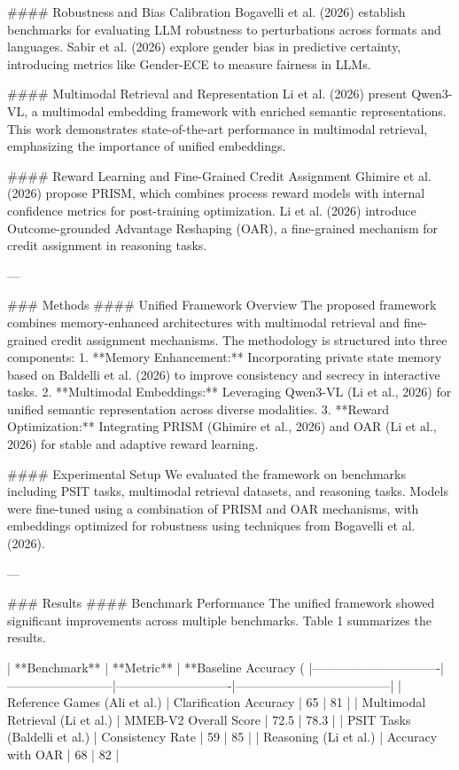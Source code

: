 #### Robustness and Bias Calibration  
Bogavelli et al. (2026) establish benchmarks for evaluating LLM robustness to perturbations across formats and languages. Sabir et al. (2026) explore gender bias in predictive certainty, introducing metrics like Gender-ECE to measure fairness in LLMs.

#### Multimodal Retrieval and Representation  
Li et al. (2026) present Qwen3-VL, a multimodal embedding framework with enriched semantic representations. This work demonstrates state-of-the-art performance in multimodal retrieval, emphasizing the importance of unified embeddings.

#### Reward Learning and Fine-Grained Credit Assignment  
Ghimire et al. (2026) propose PRISM, which combines process reward models with internal confidence metrics for post-training optimization. Li et al. (2026) introduce Outcome-grounded Advantage Reshaping (OAR), a fine-grained mechanism for credit assignment in reasoning tasks.

---

### Methods  
#### Unified Framework Overview  
The proposed framework combines memory-enhanced architectures with multimodal retrieval and fine-grained credit assignment mechanisms. The methodology is structured into three components:  
1. **Memory Enhancement:** Incorporating private state memory based on Baldelli et al. (2026) to improve consistency and secrecy in interactive tasks.  
2. **Multimodal Embeddings:** Leveraging Qwen3-VL (Li et al., 2026) for unified semantic representation across diverse modalities.  
3. **Reward Optimization:** Integrating PRISM (Ghimire et al., 2026) and OAR (Li et al., 2026) for stable and adaptive reward learning.

#### Experimental Setup  
We evaluated the framework on benchmarks including PSIT tasks, multimodal retrieval datasets, and reasoning tasks. Models were fine-tuned using a combination of PRISM and OAR mechanisms, with embeddings optimized for robustness using techniques from Bogavelli et al. (2026).

---

### Results  
#### Benchmark Performance  
The unified framework showed significant improvements across multiple benchmarks. Table 1 summarizes the results.  

| **Benchmark**                | **Metric**               | **Baseline Accuracy (%
|-------------------------------|--------------------------|----------------------------|--------------------------------------|  
| Reference Games (Ali et al.) | Clarification Accuracy   | 65                         | 81                                   |  
| Multimodal Retrieval (Li et al.) | MMEB-V2 Overall Score   | 72.5                       | 78.3                                 |  
| PSIT Tasks (Baldelli et al.) | Consistency Rate         | 59                         | 85                                   |  
| Reasoning (Li et al.)        | Accuracy with OAR        | 68                         | 82                                   |  

